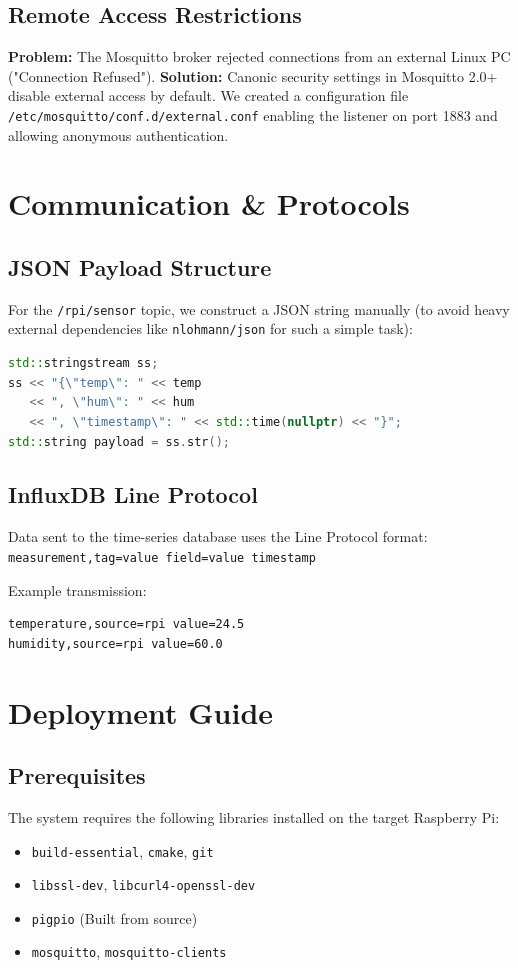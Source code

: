 \documentclass[12pt, a4paper]{article}
\begin{document}
\subsection{Remote Access Restrictions}
\textbf{Problem:} The Mosquitto broker rejected connections from an external Linux PC ("Connection Refused").
\textbf{Solution:} Canonic security settings in Mosquitto 2.0+ disable external access by default. We created a configuration file \texttt{/etc/mosquitto/conf.d/external.conf} enabling the listener on port 1883 and allowing anonymous authentication.

\newpage

\section{Communication & Protocols}

\subsection{JSON Payload Structure}
For the \texttt{/rpi/sensor} topic, we construct a JSON string manually (to avoid heavy external dependencies like \texttt{nlohmann/json} for such a simple task):

\begin{lstlisting}[language=C++]
std::stringstream ss;
ss << "{\"temp\": " << temp 
   << ", \"hum\": " << hum 
   << ", \"timestamp\": " << std::time(nullptr) << "}";
std::string payload = ss.str();
\end{lstlisting}

\subsection{InfluxDB Line Protocol}
Data sent to the time-series database uses the Line Protocol format:
\texttt{measurement,tag=value field=value timestamp}

Example transmission:
\begin{verbatim}
temperature,source=rpi value=24.5
humidity,source=rpi value=60.0
\end{verbatim}

\newpage

\section{Deployment Guide}

\subsection{Prerequisites}
The system requires the following libraries installed on the target Raspberry Pi:
\begin{itemize}
    \item \texttt{build-essential}, \texttt{cmake}, \texttt{git}
    \item \texttt{libssl-dev}, \texttt{libcurl4-openssl-dev}
    \item \texttt{pigpio} (Built from source)
    \item \texttt{mosquitto}, \texttt{mosquitto-clients}
\end{itemize}
\end{document}
